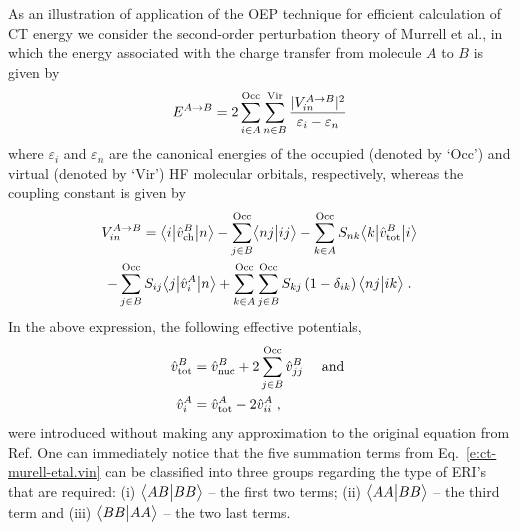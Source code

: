 As an illustration of application of the OEP technique for efficient calculation 
of CT energy we consider the second\hyp{}order perturbation theory of Murrell et al.,
in which the energy associated with the charge transfer from molecule $A$ to $B$ is given by
%
\begin{equation} \label{e:ct-murell-etal.e}
 E^{A\rightarrow B} = 2 \sum_{i\in A}^{\rm Occ} \sum_{n\in B}^{\rm Vir} 
  \frac{\vert V^{A\rightarrow B}_{in} \vert^2 }{\varepsilon_i - \varepsilon_n}
\end{equation}
%
%
where $\varepsilon_i$ and $\varepsilon_n$ are the canonical energies
of the occupied (denoted by `Occ') and virtual (denoted by `Vir') 
HF molecular orbitals, respectively,
whereas the coupling constant is given by
%
\begin{multline} \label{e:ct-murell-etal.vin}
 V^{A\rightarrow B}_{in} = 
        \bigl\langle {i} \bigl\lvert {\hat{v}^B_{\rm ch} } \bigl\lvert {n} \bigr\rangle 
      - \sum_{j\in B}^{\rm Occ} \bigl\langle {nj} \bigl\lvert {ij} \bigr\rangle 
      - \sum_{k\in A}^{\rm Occ} S_{nk} \bigl\langle {k} \bigl\lvert {\hat{v}^B_{\rm tot} } \bigl\lvert {i} \bigr\rangle \\
      - \sum_{j\in B}^{\rm Occ} S_{ij} \bigl\langle {j} \bigl\lvert {\hat{v}^A_{i} } \bigl\lvert {n} \bigr\rangle  
     + \sum_{k\in A}^{\rm Occ} \sum_{j\in B}^{\rm Occ}  
        S_{kj} \left( 1 - \delta_{ik} \right) 
        \bigl\langle {nj} \bigl\lvert {ik} \bigr\rangle \;.
\end{multline}
%
In the above expression, the following effective potentials,
%
\begin{subequations} 
\begin{align} \label{e:ct-murell-etal.vtot-vi}
 \hat{v}^B_{\rm tot} &= \hat{v}^B_{\rm nuc} + 2\sum_{j\in B}^{\rm Occ} \hat{v}^B_{jj} \quad\text{ and }\\ 
 \hat{v}^A_{i      } &= \hat{v}^A_{\rm tot} - 2\hat{v}^A_{ii} \;,
\end{align}
\end{subequations}
%
were introduced without making any approximation to the original equation
from Ref. One can immediately notice that the five summation terms
from Eq.~\eqref{e:ct-murell-etal.vin} can be classified into three groups
regarding the type of ERI's that are required:
(i) $\bigl\langle {AB} \bigl\lvert {BB} \bigr\rangle$ -- the first two terms;
(ii) $\bigl\langle {AA} \bigl\lvert {BB} \bigr\rangle$ -- the third term and
(iii) $\bigl\langle {BB} \bigl\lvert {AA} \bigr\rangle$ -- the two last terms. 

